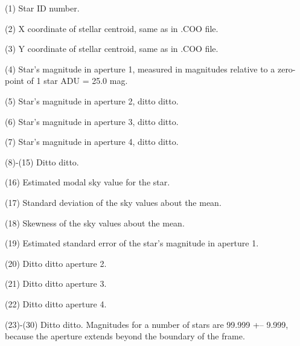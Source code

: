 \item{(1)} Star ID number.
\item{(2)} X coordinate of stellar centroid, same as in .COO file.
\item{(3)} Y coordinate of stellar centroid, same as in .COO file.
\item{(4)} Star's magnitude in aperture 1, measured in magnitudes relative to 
a zero-point of 1 star ADU = 25.0 mag.
\item{(5)} Star's magnitude in aperture 2, ditto ditto.
\item{(6)} Star's magnitude in aperture 3, ditto ditto.
\item{(7)} Star's magnitude in aperture 4, ditto ditto.
\item{(8)-(15)} Ditto ditto.
\item{(16)} Estimated modal sky value for the star.
\item{(17)} Standard deviation of the sky values about the mean.
\item{(18)} Skewness of the sky values about the mean.
\item{(19)} Estimated standard error of the star's magnitude in aperture 1.
\item{(20)} Ditto ditto aperture 2.
\item{(21)} Ditto ditto aperture 3.
\item{(22)} Ditto ditto aperture 4.
\item{(23)-(30)} Ditto ditto.
\medskip
Magnitudes for a number of stars are 99.999 +-- 9.999, because the
aperture extends beyond the boundary of the frame.

\vfill
\eject

